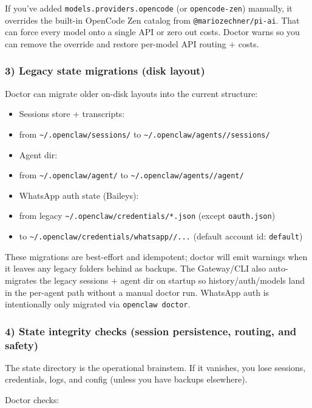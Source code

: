 If you’ve added \texttt{models.providers.opencode} (or \texttt{opencode-zen}) manually, it
overrides the built-in OpenCode Zen catalog from \texttt{@mariozechner/pi-ai}. That can
force every model onto a single API or zero out costs. Doctor warns so you can
remove the override and restore per-model API routing + costs.

\subsubsection{3) Legacy state migrations (disk layout)}


Doctor can migrate older on-disk layouts into the current structure:

\begin{itemize}
  \item Sessions store + transcripts:
  \item from \texttt{\textasciitilde{}/.openclaw/sessions/} to \texttt{\textasciitilde{}/.openclaw/agents//sessions/}
  \item Agent dir:
  \item from \texttt{\textasciitilde{}/.openclaw/agent/} to \texttt{\textasciitilde{}/.openclaw/agents//agent/}
  \item WhatsApp auth state (Baileys):
  \item from legacy \texttt{\textasciitilde{}/.openclaw/credentials/*.json} (except \texttt{oauth.json})
  \item to \texttt{\textasciitilde{}/.openclaw/credentials/whatsapp//...} (default account id: \texttt{default})
\end{itemize}


These migrations are best-effort and idempotent; doctor will emit warnings when
it leaves any legacy folders behind as backups. The Gateway/CLI also auto-migrates
the legacy sessions + agent dir on startup so history/auth/models land in the
per-agent path without a manual doctor run. WhatsApp auth is intentionally only
migrated via \texttt{openclaw doctor}.

\subsubsection{4) State integrity checks (session persistence, routing, and safety)}


The state directory is the operational brainstem. If it vanishes, you lose
sessions, credentials, logs, and config (unless you have backups elsewhere).

Doctor checks:

